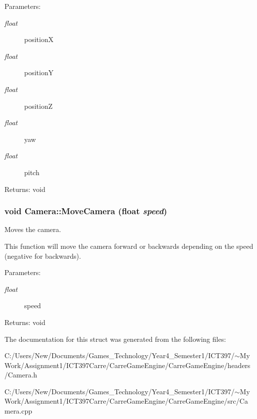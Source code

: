 \begin{Desc}
\item[Parameters:]
\begin{description}
\item[{\em float}]positionX \item[{\em float}]positionY \item[{\em float}]positionZ \item[{\em float}]yaw \item[{\em float}]pitch \end{description}
\end{Desc}
\begin{Desc}
\item[Returns:]void \end{Desc}
\hypertarget{class_camera_ec3a27aa4de4ad2d10d421ee2fa54223}{
\subsubsection[MoveCamera]{\setlength{\rightskip}{0pt plus 5cm}void Camera::MoveCamera (float {\em speed})}}
\label{class_camera_ec3a27aa4de4ad2d10d421ee2fa54223}


Moves the camera. 

This function will move the camera forward or backwards depending on the speed (negative for backwards).

\begin{Desc}
\item[Parameters:]
\begin{description}
\item[{\em float}]speed \end{description}
\end{Desc}
\begin{Desc}
\item[Returns:]void \end{Desc}


The documentation for this struct was generated from the following files:\begin{CompactItemize}
\item 
C:/Users/New/Documents/Games\_\-Technology/Year4\_\-Semester1/ICT397/$\sim$My Work/Assignment1/ICT397Carre/CarreGameEngine/CarreGameEngine/headers/Camera.h\item 
C:/Users/New/Documents/Games\_\-Technology/Year4\_\-Semester1/ICT397/$\sim$My Work/Assignment1/ICT397Carre/CarreGameEngine/CarreGameEngine/src/Camera.cpp\end{CompactItemize}
